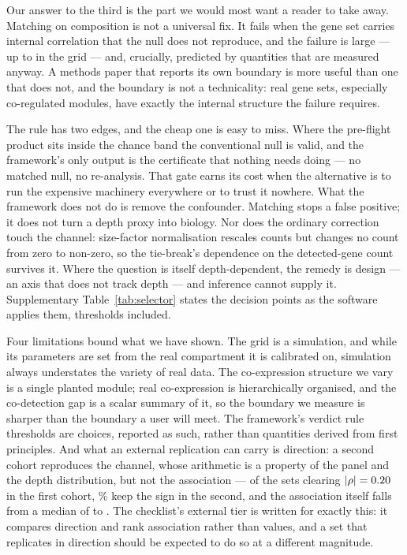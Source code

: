 \documentclass[11pt]{article}
\begin{document}
Our answer to the third is the part we would most want a reader to take away.
Matching on composition is not a universal fix. It fails when the gene set
carries internal correlation that the null does not reproduce, and the failure
is large --- up to \boundaryLooseAxisInRate{} in the grid --- and, crucially, predicted by
quantities that are measured anyway. A methods paper that reports its own
boundary is more useful than one that does not, and the boundary is not a
technicality: real gene sets, especially co-regulated modules, have exactly the
internal structure the failure requires.

The rule has two edges, and the cheap one is easy to miss. Where the pre-flight
product sits inside the chance band the conventional null is valid, and the
framework's only output is the certificate that nothing needs doing --- no
matched null, no re-analysis. That gate earns its cost when the alternative is
to run the expensive machinery everywhere or to trust it nowhere. What the
framework does not do is remove the confounder. Matching stops a false
positive; it does not turn a depth proxy into biology. Nor does the ordinary
correction touch the channel: size-factor normalisation
\citep{anders2010,robinson2010,lun2016,hafemeister2019} rescales counts but
changes no count from zero to non-zero, so the tie-break's dependence on the
detected-gene count survives it. Where the question is
itself depth-dependent, the remedy is design --- an axis that does not track
depth --- and inference cannot supply it.
Supplementary Table~\ref{tab:selector} states the decision points as the
software applies them, thresholds included.

Four limitations bound what we have shown. The grid is a simulation, and while
its parameters are set from the real compartment it is calibrated on, simulation
always understates the variety of real data. The co-expression structure we vary
is a single planted module; real co-expression is hierarchically organised, and
the co-detection gap is a scalar summary of it, so the boundary we measure is
sharper than the boundary a user will meet. The framework's verdict rule
thresholds are choices, reported as such, rather than quantities derived from
first principles. And what an external replication can carry is direction:
a second cohort reproduces the channel, whose
arithmetic is a property of the panel and the depth distribution, but not the
association --- of the
\benchCohortStrongN{} sets clearing $|\rho| = 0.20$ in the
first cohort, \benchCohortStrongSign{}\% keep the sign in the second, and the
association itself falls from a median of \benchCohortStrongFirst{} to
\benchCohortStrongSecond. The checklist's external tier is written for exactly
this: it compares direction and rank association rather than values, and a set
that replicates in direction should be expected to do so at a different
magnitude.
\end{document}
